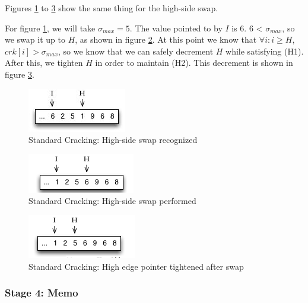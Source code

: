 Figures \ref{fig:cracking_scan_high_side_1} to \ref{fig:cracking_scan_high_side_3} show the same thing for the high-side swap.

For figure \ref{fig:cracking_scan_high_side_1}, we will take $\sigma _{max} = 5$. The value pointed to by $I$ is 6. 6 < $\sigma _{max}$, so we swap it up to $H$, as shown in figure \ref{fig:cracking_scan_high_side_2}. At this point we know that $\forall i: i \geq H$, $crk[i] > \sigma _{max}$, so we know that we can safely decrement $H$ while satisfying (H1). After this, we tighten $H$ in order to maintain (H2). This decrement is shown in figure \ref{fig:cracking_scan_high_side_3}.

\begin{figure}[H]
  \centering
  \includegraphics[]{images/d3_background_cracking_scan_2a}
  \caption{Standard Cracking: High-side swap recognized}
  \label{fig:cracking_scan_high_side_1}
\end{figure}


\begin{figure}[H]
  \centering
  \includegraphics[]{images/d3_background_cracking_scan_2b}
  \caption{Standard Cracking: High-side swap performed}
  \label{fig:cracking_scan_high_side_2}
\end{figure}

\begin{figure}[H]
  \centering
  \includegraphics[]{images/d3_background_cracking_scan_2c}
  \caption{Standard Cracking: High edge pointer tightened after swap}
  \label{fig:cracking_scan_high_side_3}
\end{figure}

\subsubsection{Stage 4: Memo}

